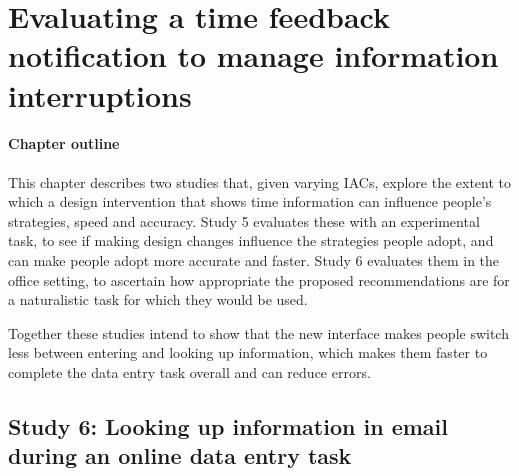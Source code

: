 \chapter{Evaluating a time feedback notification to manage information interruptions}

\begin{mynote}
\subsubsection{Chapter outline}
This chapter describes two studies that, given varying IACs, explore the extent to which a design intervention that shows time information can influence people's strategies, speed and accuracy. Study 5 evaluates these with an experimental task, to see if making design changes influence the strategies people adopt, and can make people adopt more accurate and faster. Study 6 evaluates them in the office setting, to ascertain how appropriate the proposed recommendations are for a naturalistic task for which they would be used.

Together these studies intend to show that the new interface makes people switch less between entering and looking up information, which makes them faster to complete the data entry task overall and can reduce errors.
\end{mynote}

\section{Study 6: Looking up information in email during an online data entry task}


